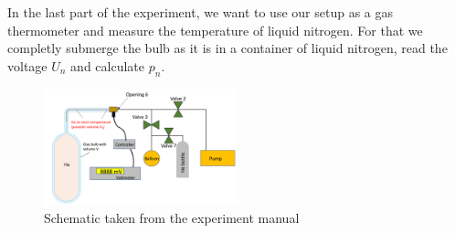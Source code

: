 In the last part of the experiment, we want to use our setup as a gas thermometer and measure the temperature of liquid nitrogen. For that we completly submerge the bulb as it is in a container of liquid nitrogen, read the voltage $U_n$ and calculate $p_n$.

\begin{figure}[h]
	\centering
	\includegraphics[width=0.5\textwidth]{sections/images/schematic.png}
	\caption{Schematic taken from the experiment manual}
\end{figure}
